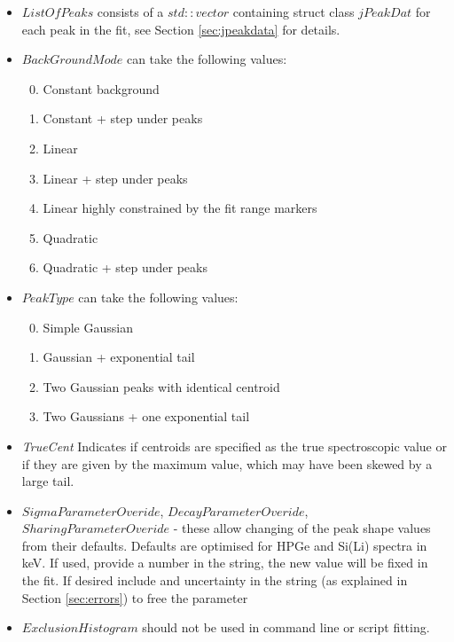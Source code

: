 \documentclass[a4paper,10pt]{article}
\begin{document}
\renewcommand{\labelenumi}{\arabic{enumi}}
\begin{itemize}
	\item $ListOfPeaks$ consists of a $std::vector$ containing struct class $jPeakDat$ for each peak in the fit, see Section \ref{sec:jpeakdata} for details.
	\item $BackGroundMode$ can take the following values:
      \begin{enumerate}
      \setcounter{enumi}{-1}
      \item Constant background
      \item Constant + step under peaks
      \setcounter{enumi}{9}
      \item Linear
      \item Linear + step under peaks
      \item Linear highly constrained by the fit range markers
      \setcounter{enumi}{19}
      \item Quadratic
      \item Quadratic + step under peaks
      \end{enumerate}
    \item $PeakType$ can take the following values:
      \begin{enumerate}
      \setcounter{enumi}{-1}
      \item Simple Gaussian
      \item Gaussian + exponential tail
      \setcounter{enumi}{9}
      \item Two Gaussian peaks with identical centroid 
      \item Two Gaussians + one exponential tail
      \end{enumerate}
    \item \textit{TrueCent} Indicates if centroids are specified as the true spectroscopic value or if they are given by the maximum value, which may have been skewed by a large tail. 
    \item $SigmaParameterOveride$, $DecayParameterOveride$, $SharingParameterOveride$ - these allow changing of the peak shape values from their defaults. Defaults are optimised for HPGe and Si(Li) spectra in keV. If used, provide a number in the string, the new value will be fixed in the fit. If desired include and uncertainty in the string (as explained in Section \ref{sec:errors}) to free the parameter
    \item $ExclusionHistogram$ should not be used in command line or script fitting.   
\end{itemize}
\end{document}
